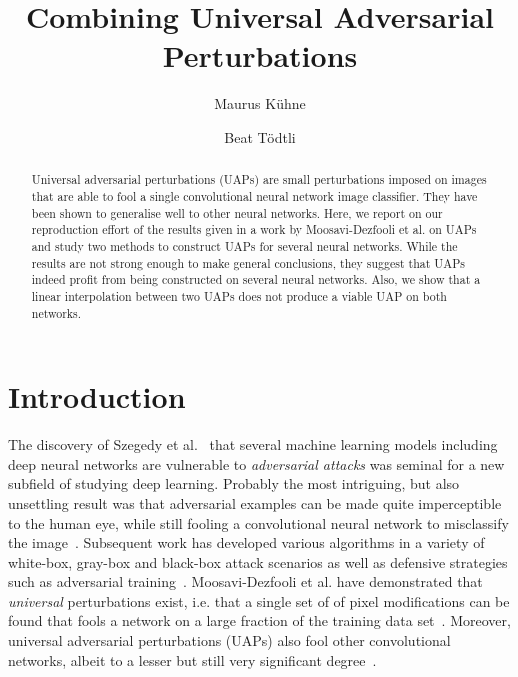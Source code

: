 \documentclass[runningheads]{llncs}
\begin{document}
%
\title{Combining Universal Adversarial Perturbations}%
%
%
\author{Maurus K\"uhne \and
Beat Tödtli} %
%
%
%
\maketitle              %
%
\begin{abstract}
Universal adversarial perturbations (UAPs) are small perturbations imposed on images that are able to fool a single convolutional neural network image classifier. They have been shown to generalise well to other neural networks. Here, we report on our reproduction effort of the results given in a work by Moosavi-Dezfooli et al. on UAPs and study two methods to construct UAPs for several neural networks. While the results are not strong enough to make general conclusions, they suggest that UAPs indeed profit from being constructed on several neural networks. Also, we show that a linear interpolation between two UAPs does not produce a viable UAP on both networks.
\end{abstract}
%
%
%
\section{Introduction}
The discovery of Szegedy et al.~\cite{Szegedy_2014} that several machine learning models including deep neural networks are vulnerable to \emph{adversarial attacks} was seminal for a new subfield of studying deep learning. Probably the most intriguing, but also unsettling result was that adversarial examples can be made quite imperceptible to the human eye, while still fooling a convolutional neural network to misclassify the image~\cite{goodfellow_2014}. Subsequent work has developed various algorithms in a variety of white-box, gray-box and black-box attack scenarios as well as defensive strategies such as adversarial training~\cite{REN2020346}. Moosavi-Dezfooli et al. have demonstrated that \emph{universal} perturbations exist, i.e. that a single set of of pixel modifications can be found that fools a network on a large fraction of the training data set~\cite{moosavidezfooli_universal_2017}. Moreover, universal adversarial perturbations (UAPs) also fool other convolutional networks, albeit to a lesser but still very significant degree~\cite{moosavidezfooli_universal_2017}. 
\end{document}
